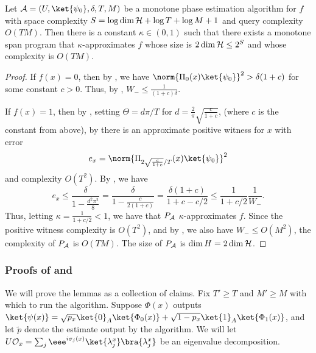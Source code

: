 \documentclass{toc}
\begin{document}
\begin{corollary}
Let ${\cal A}=(U,\ket{\psi_0},\delta,T,M)$ be a monotone phase estimation algorithm for $f$ with space complexity $S=\log \dim {\cal H}+\log T+\log M+1$ and query complexity $O(TM)$. Then there is a constant $\kappa\in(0,1)$ such that there exists a monotone span program that $\kappa$-approximates $f$ whose size is $2\dim{\cal H}\leq 2^S$ and whose complexity is $O(TM)$.
\end{corollary}
\begin{proof}
If $f(x)=0$, then by , we have $\norm{\Pi_0(x)\ket{\psi_0}}^2 > \delta(1+c)$ for some constant $c>0$. Thus, by , $W_-\leq \frac{1}{(1+c)\delta}$. 

If $f(x)=1$, then by , setting $\Theta=d\pi/T$ for $d=\frac{2}{\pi}\sqrt{\frac{c}{1+c}}$, (where $c$ is the constant from above), by  there is an approximate positive witness for $x$ with error 
$$e_x=\norm{\Pi_{2\sqrt{\frac{c}{1+c}}/T}(x)\ket{\psi_0}}^2$$
and complexity $O(T^2)$. By , we have
$$e_x\leq \frac{\delta}{1-\frac{d^2\pi^2}{8}} = \frac{\delta}{1-\frac{c}{2(1+c)}}=\frac{\delta(1+c)}{1+c - c/2}\leq \frac{1}{1+c/2}\frac{1}{W_-}.$$
Thus, letting $\kappa=\frac{1}{1+c/2}<1$, we have that $P_{\cal A}$ $\kappa$-approximates $f$. Since the positive witness complexity is $O(T^2)$, and by , we also have $W_-\leq O(M^2)$, the complexity of $P_{\cal A}$ is $O(TM)$. The size of $P_{\cal A}$ is $\dim H=2\dim{\cal H}$.
\end{proof}

%

\subsubsection{Proofs of  and }
\label{sec:monotone-phase-alg-proofs}

We will prove the lemmas as a collection of claims. Fix $T'\geq T$ and $M'\geq M$ with which to run the algorithm. Suppose $\Phi(x)$ outputs $\ket{\psi(x)}=\sqrt{p_x}\ket{0}_A\ket{\Phi_0(x)}+\sqrt{1-p_x}\ket{1}_A\ket{\Phi_1(x)}$, and let $\tilde p$ denote the estimate output by the algorithm. We will let $U{\cal O}_x=\sum_j \eee^{i\sigma_j(x)}\ket{\lambda_j^x}\bra{\lambda_j^x}$ be an eigenvalue decomposition.
\end{document}
